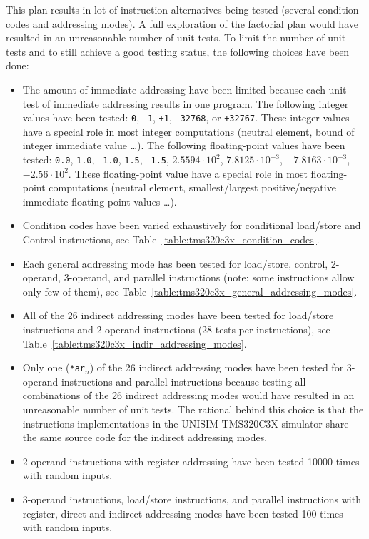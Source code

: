 This plan results in lot of instruction alternatives being tested (several condition codes and addressing modes).  A full exploration of the factorial plan would have resulted in an unreasonable number of unit tests. To limit the number of unit tests and to still achieve a good testing status, the following choices have been done:
\begin{itemize}
\item The amount of immediate addressing have been limited because each unit test of immediate addressing results in one program. The following integer values have been tested: \texttt{0}, \texttt{-1}, \texttt{+1}, \texttt{-32768}, or \texttt{+32767}. These integer values have a special role in most integer computations (neutral element, bound of integer immediate value \ldots). The following floating-point values have been tested: \texttt{0.0}, \texttt{1.0}, \texttt{-1.0}, \texttt{1.5}, \texttt{-1.5}, \texttt{$2.5594 \cdot 10^2$}, \texttt{$7.8125 \cdot 10^{-3}$}, \texttt{$-7.8163 \cdot 10^{-3}$}, \texttt{$-2.56 \cdot 10^2$}. These floating-point value have a special role in most floating-point computations (neutral element, smallest/largest positive/negative immediate floating-point values \ldots).
\item Condition codes have been varied exhaustively for conditional load/store and Control instructions, see Table~\ref{table:tms320c3x_condition_codes}.
\item Each general addressing mode has been tested for load/store, control, 2-operand, 3-operand, and parallel instructions (note: some instructions allow only few of them), see Table~\ref{table:tms320c3x_general_addressing_modes}.
\item All of the 26 indirect addressing modes have been tested for load/store instructions and 2-operand instructions (28 tests per instructions), see Table~\ref{table:tms320c3x_indir_addressing_modes}.
\item Only one (\texttt{*ar$_n$}) of the 26 indirect addressing modes have been tested for 3-operand instructions and parallel instructions because testing all combinations of the 26 indirect addressing modes would have resulted in an unreasonable number of unit tests.
The rational behind this choice is that the instructions implementations in the UNISIM TMS320C3X simulator share the same source code for the indirect addressing modes.
\item 2-operand instructions with register addressing have been tested 10000 times with random inputs.
\item 3-operand instructions, load/store instructions, and parallel instructions with register, direct and indirect addressing modes have been tested 100 times with random inputs.

\end{itemize}
